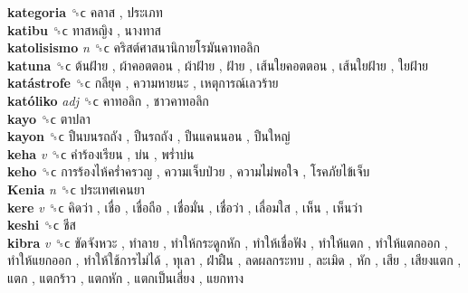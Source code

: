 \textbf{kategoria} ␝ϲ   คลาส ,  ประเภท   \\
\textbf{katibu} ␝ϲ   ทาสหญิง ,  นางทาส   \\
\textbf{katolisismo} \emph{n}  ␝ϲ   คริสต์ศาสนานิกายโรมันคาทอลิก   \\
\textbf{katuna} ␝ϲ   ต้นฝ้าย ,  ผ้าคอตตอน ,  ผ้าฝ้าย ,  ฝ้าย ,  เส้นใยคอตตอน ,  เส้นใยฝ้าย ,  ใยฝ้าย   \\
\textbf{katástrofe} ␝ϲ   กลียุค ,  ความหายนะ ,  เหตุการณ์เลวร้าย   \\
\textbf{katóliko} \emph{adj}  ␝ϲ   คาทอลิก ,  ชาวคาทอลิก   \\
\textbf{kayo} ␝ϲ   ตาปลา   \\
\textbf{kayon} ␝ϲ   ปืนบนรถถัง ,  ปืนรถถัง ,  ปืนแคนนอน ,  ปืนใหญ่   \\
\textbf{keha} \emph{v}  ␝ϲ   คำร้องเรียน ,  บ่น ,  พร่ำบ่น   \\
\textbf{keho} ␝ϲ   การร้องไห้คร่ำครวญ ,  ความเจ็บป่วย ,  ความไม่พอใจ ,  โรคภัยไข้เจ็บ   \\
\textbf{Kenia} \emph{n}  ␝ϲ   ประเทศเคนยา   \\
\textbf{kere} \emph{v}  ␝ϲ   คิดว่า ,  เชื่อ ,  เชื่อถือ ,  เชื่อมั่น ,  เชื่อว่า ,  เลื่อมใส ,  เห็น ,  เห็นว่า   \\
\textbf{keshi} ␝ϲ   ชีส   \\
\textbf{kibra} \emph{v}  ␝ϲ   ขัดจังหวะ ,  ทำลาย ,  ทำให้กระดูกหัก ,  ทำให้เชื่อฟัง ,  ทำให้แตก ,  ทำให้แตกออก ,  ทำให้แยกออก ,  ทำให้ใช้การไม่ได้ ,  ทุเลา ,  ฝ่าฝืน ,  ลดผลกระทบ ,  ละเมิด ,  หัก ,  เสีย ,  เสียงแตก ,  แตก ,  แตกร้าว ,  แตกหัก ,  แตกเป็นเสี่ยง ,  แยกทาง   \\
